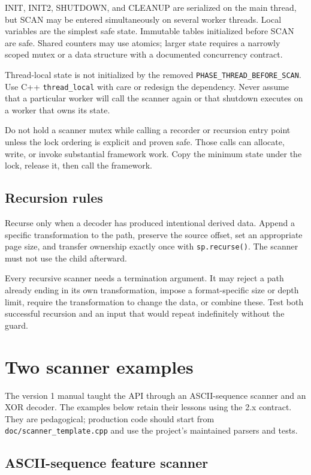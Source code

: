 \documentclass[11pt]{article}
\newcommand{\code}[1]{\texttt{#1}}
\begin{document}
INIT, INIT2, SHUTDOWN, and CLEANUP are serialized on the main thread, but SCAN
may be entered simultaneously on several worker threads. Local variables are
the simplest safe state. Immutable tables initialized before SCAN are safe.
Shared counters may use atomics; larger state requires a narrowly scoped mutex
or a data structure with a documented concurrency contract.

Thread-local state is not initialized by the removed
\code{PHASE\_THREAD\_BEFORE\_SCAN}. Use C++ \code{thread\_local} with care or
redesign the dependency. Never assume that a particular worker will call the
scanner again or that shutdown executes on a worker that owns its state.

Do not hold a scanner mutex while calling a recorder or recursion entry point
unless the lock ordering is explicit and proven safe. Those calls can allocate,
write, or invoke substantial framework work. Copy the minimum state under the
lock, release it, then call the framework.

\subsection{Recursion rules}

Recurse only when a decoder has produced intentional derived data. Append a
specific transformation to the path, preserve the source offset, set an
appropriate page size, and transfer ownership exactly once with
\code{sp.recurse()}. The scanner must not use the child afterward.

Every recursive scanner needs a termination argument. It may reject a path
already ending in its own transformation, impose a format-specific size or
depth limit, require the transformation to change the data, or combine these.
Test both successful recursion and an input that would repeat indefinitely
without the guard.

\section{Two scanner examples}

The version 1 manual taught the API through an ASCII-sequence scanner and an
XOR decoder. The examples below retain their lessons using the 2.x contract.
They are pedagogical; production code should start from
\code{doc/scanner\_template.cpp} and use the project's maintained parsers and
tests.

\subsection{ASCII-sequence feature scanner}
\end{document}
